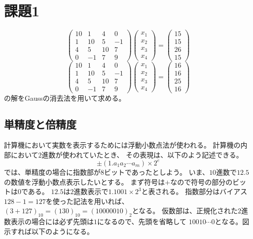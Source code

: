 \documentclass{jsarticle}
\begin{document}
\section{課題1}
\begin{equation}
  \left(
  \begin{array}{rrrr}
      10 & 1 & 4& 0\\
      1 & 10 & 5 & -1\\
      4 & 5 & 10 & 7\\
      0 & -1 & 7 & 9 
  \end{array}
  \right)
  \left(
  \begin{array}{r}
      x_1\\
      x_2\\
      x_3\\
      x_4 
  \end{array}
  \right)
  =
  \left(
  \begin{array}{r}
      15\\
      15\\
      26\\
      15
  \end{array}
  \right)
\end{equation}
\begin{equation}
  \left(
  \begin{array}{rrrr}
      10 & 1 & 4& 0\\
      1 & 10 & 5 & -1\\
      4 & 5 & 10 & 7\\
      0 & -1 & 7 & 9 
  \end{array}
  \right)
  \left(
  \begin{array}{r}
      x_1\\
      x_2\\
      x_3\\
      x_4 
  \end{array}
  \right)
  =
  \left(
  \begin{array}{r}
      16\\
      16\\
      25\\
      16
  \end{array}
  \right)
\end{equation}
の解をGaussの消去法を用いて求める。
\subsection{単精度と倍精度}
計算機において実数を表示するためには浮動小数点法が使われる。
計算機の内部において$2$進数が使われていたとき、
その表現は、以下のよう記述できる。
\begin{equation}
  \pm (1.a_1 a_2 \cdots a_m) \times 2^e
\end{equation}
では、単精度の場合に指数部が$8$ビットであったとしよう。
いま、$10$進数で$12.5$の数値を浮動小数点表示したいとする。
まず符号は$+$なので符号の部分のビットは$0$である。
$12.5$は$2$進数表示で$1.1001 \times 2^3$と表される。
指数部分はバイアス$128-1=127$を使った記法を用いれば、$(3 + 127)_{10} =(130)_{10} = (10000010)_2$となる。
仮数部は、正規化された$2$進数表示の場合には必ず先頭は$1$になるので、先頭を省略して
$10010\cdots0$となる。図示すれば以下のようになる。
\end{document}
